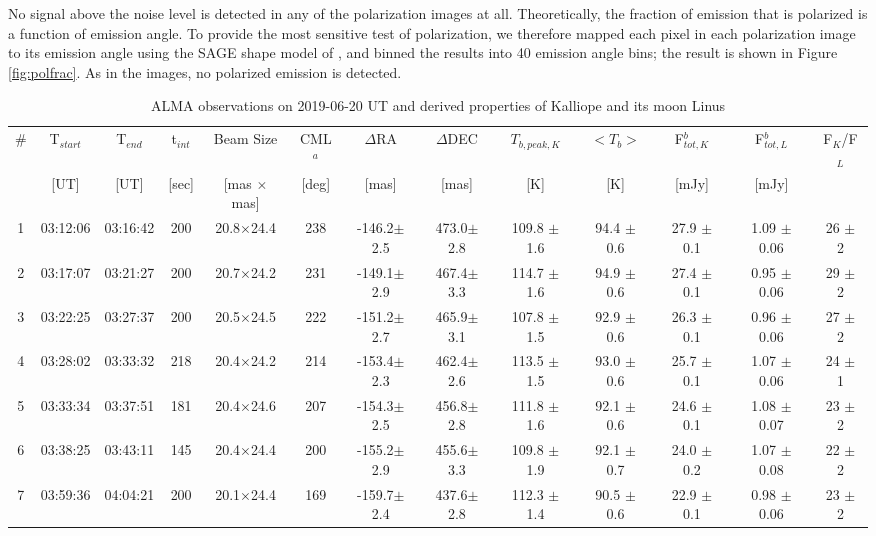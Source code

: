 \documentclass[]{aastex631}
\begin{document}
No signal above the noise level is detected in any of the polarization images at all. Theoretically, the fraction of emission that is polarized is a function of emission angle. To provide the most sensitive test of polarization, we therefore mapped each pixel in each polarization image to its emission angle using the SAGE shape model of \cite{ferrais2022}, and binned the results into 40 emission angle bins; the result is shown in Figure \ref{fig:polfrac}. As in the images, no polarized emission is detected.

\begin{table}[h!]
\scriptsize
\begin{center}
\caption{ALMA observations on 2019-06-20 UT and derived properties of Kalliope and its moon Linus \label{tbl:obs}}
\begin{tabular}{ccccccccccccc}
\hline
\hline
\# & T$_{start}$ & T$_{end}$ & t$_{int}$ & Beam Size & CML$^a$ & $\Delta$RA & $\Delta$DEC & $T_{b,peak,K}$ & $<T_b>$ & F$_{tot,K}^b$ & F$_{tot,L}^b$ & F$_K$/F$_L$ \\
 & [UT] & [UT] & [sec] & [mas $\times$ mas] & [deg] & [mas] & [mas] & [K] & [K] & [mJy] & [mJy] & \\
\hline
1 & 03:12:06 & 03:16:42 & 200 & 20.8$\times$24.4 & 238 & -146.2$\pm$2.5 & 473.0$\pm$2.8 & 109.8 $\pm$ 1.6 & 94.4 $\pm$ 0.6 & 27.9 $\pm$ 0.1 & 1.09 $\pm$ 0.06 & 26 $\pm$ 2 \\ 
2 & 03:17:07 & 03:21:27 & 200 & 20.7$\times$24.2 & 231 & -149.1$\pm$2.9 & 467.4$\pm$3.3 & 114.7 $\pm$ 1.6 & 94.9 $\pm$ 0.6 & 27.4 $\pm$ 0.1 & 0.95 $\pm$ 0.06 & 29 $\pm$ 2 \\ 
3 & 03:22:25 & 03:27:37 & 200 & 20.5$\times$24.5 & 222 & -151.2$\pm$2.7 & 465.9$\pm$3.1 & 107.8 $\pm$ 1.5 & 92.9 $\pm$ 0.6 & 26.3 $\pm$ 0.1 & 0.96 $\pm$ 0.06 & 27 $\pm$ 2 \\ 
4 & 03:28:02 & 03:33:32 & 218 & 20.4$\times$24.2 & 214 & -153.4$\pm$2.3 & 462.4$\pm$2.6 & 113.5 $\pm$ 1.5 & 93.0 $\pm$ 0.6 & 25.7 $\pm$ 0.1 & 1.07 $\pm$ 0.06 & 24 $\pm$ 1 \\ 
5 & 03:33:34 & 03:37:51 & 181 & 20.4$\times$24.6 & 207 & -154.3$\pm$2.5 & 456.8$\pm$2.8 & 111.8 $\pm$ 1.6 & 92.1 $\pm$ 0.6 & 24.6 $\pm$ 0.1 & 1.08 $\pm$ 0.07 & 23 $\pm$ 2 \\ 
6 & 03:38:25 & 03:43:11 & 145 & 20.4$\times$24.4 & 200 & -155.2$\pm$2.9 & 455.6$\pm$3.3 & 109.8 $\pm$ 1.9 & 92.1 $\pm$ 0.7 & 24.0 $\pm$ 0.2 & 1.07 $\pm$ 0.08 & 22 $\pm$ 2 \\ 
7 & 03:59:36 & 04:04:21 & 200 & 20.1$\times$24.4 & 169 & -159.7$\pm$2.4 & 437.6$\pm$2.8 & 112.3 $\pm$ 1.4 & 90.5 $\pm$ 0.6 & 22.9 $\pm$ 0.1 & 0.98 $\pm$ 0.06 & 23 $\pm$ 2 \\ 

\end{tabular}
\end{center}
\end{table}
\end{document}
